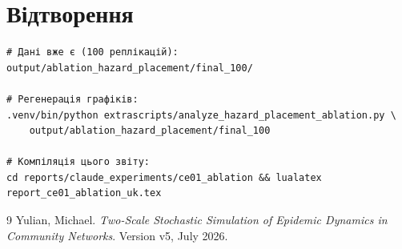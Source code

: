 \documentclass[11pt,a4paper]{article}
\begin{document}
\section{Відтворення}

\begin{verbatim}
# Дані вже є (100 реплікацій):
output/ablation_hazard_placement/final_100/

# Регенерація графіків:
.venv/bin/python extrascripts/analyze_hazard_placement_ablation.py \
    output/ablation_hazard_placement/final_100

# Компіляція цього звіту:
cd reports/claude_experiments/ce01_ablation && lualatex report_ce01_ablation_uk.tex
\end{verbatim}

\begin{thebibliography}{9}
  Yulian, Michael.
  \textit{Two-Scale Stochastic Simulation of Epidemic Dynamics in Community Networks}.
  Version v5, July 2026.
\end{thebibliography}
\end{document}
